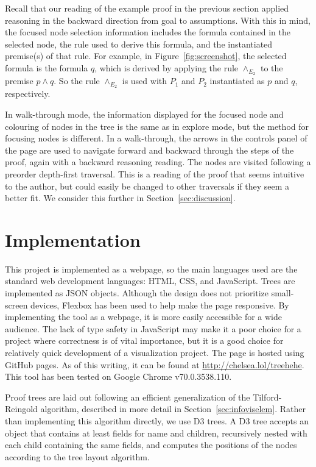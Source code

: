 \documentclass[journal]{vgtc}                %
\begin{document}
Recall that our reading of the example proof in the previous section applied reasoning in the backward direction from goal to assumptions. With this in mind, the focused node selection information includes the formula contained in the selected node, the rule used to derive this formula, and the instantiated premise(s) of that rule. For example, in Figure~\ref{fig:screenshot}, the selected formula is the formula $q$, which is derived by applying the rule $\wedge_{E_2}$ to the premise $p \wedge q$. So the rule $\wedge_{E_2}$ is used with $P_1$ and $P_2$ instantiated as $p$ and $q$, respectively.

In walk-through mode, the information displayed for the focused node and colouring of nodes in the tree is the same as in explore mode, but the method for focusing nodes is different. In a walk-through, the arrows in the controls panel of the page are used to navigate forward and backward through the steps of the proof, again with a backward reasoning reading. The nodes are visited following a preorder depth-first traversal. This is a reading of the proof that seems intuitive to the author, but could easily be changed to other traversals if they seem a better fit. We consider this further in Section~\ref{sec:discussion}.


\section{Implementation}
\label{sec:technology}

This project is implemented as a webpage, so the main languages used are the standard web development languages: HTML, CSS, and JavaScript. Trees are implemented as JSON objects. Although the design does not prioritize small-screen devices, Flexbox has been used to help make the page responsive. By implementing the tool as a webpage, it is more easily accessible for a wide audience. The lack of type safety in JavaScript may make it a poor choice for a project where correctness is of vital importance, but it is a good choice for relatively quick development of a visualization project. The page is hosted using GitHub pages. As of this writing, it can be found at \href{chelsea.lol/treehehe}{http://chelsea.lol/treehehe}. This tool has been tested on Google Chrome v70.0.3538.110.

Proof trees are laid out following an efficient generalization of the Tilford-Reingold algorithm, described in more detail in Section~\ref{sec:infoviselem}. Rather than implementing this algorithm directly, we use D3 trees. A D3 tree accepts an object that contains at least fields for name and children, recursively nested with each child containing the same fields, and computes the positions of the nodes according to the tree layout algorithm.
\end{document}
